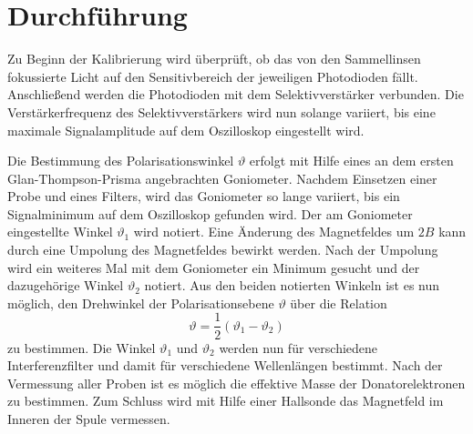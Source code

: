 \section{Durchführung}
\label{sec:Durchführung}

Zu Beginn der Kalibrierung wird überprüft, ob das von den Sammellinsen
fokussierte Licht auf den Sensitivbereich der jeweiligen Photodioden fällt.
Anschließend werden die Photodioden mit dem Selektivverstärker verbunden.
Die Verstärkerfrequenz des Selektivverstärkers wird nun solange variiert,
bis eine maximale Signalamplitude auf dem Oszilloskop eingestellt wird.

Die Bestimmung des Polarisationswinkel $\vartheta$ erfolgt mit Hilfe eines
an dem ersten Glan-Thompson-Prisma angebrachten Goniometer. Nachdem Einsetzen einer
Probe und eines Filters, wird das Goniometer so lange variiert, bis ein Signalminimum
auf dem Oszilloskop gefunden wird. Der am Goniometer eingestellte Winkel $\vartheta_1$ wird
notiert. Eine Änderung des Magnetfeldes um $2B$ kann durch eine Umpolung des
Magnetfeldes bewirkt werden. Nach der Umpolung wird ein weiteres Mal mit dem
Goniometer ein Minimum gesucht und der dazugehörige Winkel $\vartheta_2$ notiert.
Aus den beiden notierten Winkeln ist es nun möglich, den Drehwinkel der Polarisationsebene
$\vartheta$ über die Relation
\begin{equation}
  \label{eq:theta_aus_messung}
  \vartheta = \frac{1}{2}(\vartheta_1 - \vartheta_2)
\end{equation}
zu bestimmen. Die Winkel $\vartheta_1$ und $\vartheta_2$ werden nun für verschiedene
Interferenzfilter und damit für verschiedene Wellenlängen bestimmt.
Nach der Vermessung aller Proben ist es möglich die effektive Masse der Donatorelektronen zu bestimmen.
Zum Schluss wird mit Hilfe einer Hallsonde das Magnetfeld im Inneren der Spule
vermessen.
